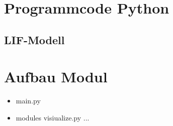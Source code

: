 \appendix
%
\chapter{Programmcode Python}
%

\section{LIF-Modell}
\label{sec:lifpy}
%

%
\chapter{Aufbau Modul}
%

\begin{itemize}
	\item main.py
	\item modules
		\subitem visiualize.py
		\subitem ...
\end{itemize}


